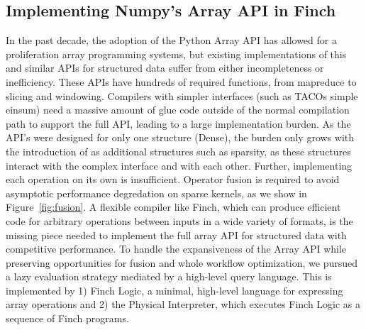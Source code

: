 \subsection{Implementing Numpy's Array API in Finch}
In the past decade, the adoption of the Python Array API \cite{harris_array_2020} has allowed for a proliferation array programming systems, but existing implementations of this and similar APIs for structured data suffer from either incompleteness or inefficiency.
%
These APIs have hundreds of required functions, from mapreduce to slicing and windowing. 
%
Compilers with simpler interfaces (such as TACOs simple einsum) need a massive amount of glue code outside of the normal compilation path to support the full API, leading to a large implementation burden.
%
As the API's were designed for only one structure (Dense), the burden only grows with the introduction of as additional structures such as sparsity, as these structures interact with the complex interface and with each other.
%
%
Further, implementing each operation on its own is insufficient. Operator fusion is required to avoid asymptotic performance degredation on sparse kernels, as we show in Figure~\ref{fig:fusion}.
%
A flexible compiler like Finch, which can produce efficient code for arbitrary operations between inputs in a wide variety of formats, is the missing piece needed to implement the full array API for structured data with competitive performance.
%
To handle the expansiveness of the Array API while preserving opportunities for fusion and whole workflow optimization, we pursued a lazy evaluation strategy mediated by a high-level query language.
%
This is implemented by 1) Finch Logic, a minimal, high-level language for expressing array operations and 2) the Physical Interpreter, which executes Finch Logic as a sequence of Finch programs.




